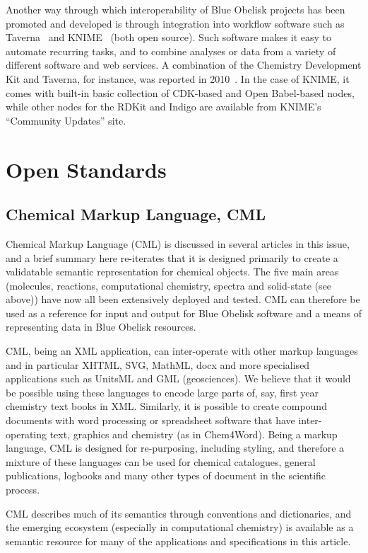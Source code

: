 \documentclass[10pt]{bmc_article}
\newenvironment{bmcformat}{\fussy\setboolean{publ}{true}}{\fussy}
\begin{document}
\begin{bmcformat}
Another way through which interoperability of Blue Obelisk projects
has been promoted and developed is through integration into
workflow software such as Taverna~\cite{Hull:2006p60} and
KNIME~\cite{WebKNIME} (both open source).
Such software makes it easy to automate recurring
tasks, and to combine analyses or data from a variety of different software
and web services.
A combination of the Chemistry Development Kit and Taverna, for instance, was
reported in 2010~\cite{Kuhn:2010p4001}. 
In the case of KNIME, it comes with built-in basic collection of CDK-based and
Open Babel-based nodes, while other nodes for the RDKit and Indigo are
available from KNIME's ``Community Updates'' site.


\section*{Open Standards}

\subsection*{Chemical Markup Language, CML}

Chemical Markup Language (CML) is discussed in several articles in this
issue, and a brief summary here re-iterates that it is designed
primarily to create a validatable semantic representation for chemical
objects. The five main areas (molecules, reactions, computational
chemistry, spectra and solid-state (see above)) have now all been
extensively deployed and tested. CML can therefore be used as a
reference for input and output for Blue Obelisk software and a means
of representing data in Blue Obelisk resources.

CML, being an XML application, can inter-operate with other markup
languages and in particular XHTML, SVG, MathML, docx and more
specialised applications such as UnitsML and GML (geosciences). We
believe that it would be possible using these languages to encode
large parts of, say, first year chemistry text books in XML.
Similarly, it is possible to create compound documents with word
processing or spreadsheet software that have inter-operating text,
graphics and chemistry (as in Chem4Word). Being a markup language, CML
is designed for re-purposing, including styling, and therefore a
mixture of these languages can be used for chemical catalogues,
general publications, logbooks and many other types of document in the
scientific process.

CML describes much of its semantics through conventions and
dictionaries, and the emerging ecosystem (especially in computational
chemistry) is available as a semantic resource for many of the
applications and specifications in this article.



\end{bmcformat}
\end{document}
